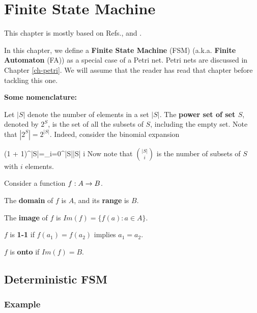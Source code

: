 \chapter{Finite State Machine}
\label{ch-finite-state}

This chapter is mostly based on Refs.\cite{fsm-brilliant}, \cite{wiki-det-automaton} and
\cite{wiki-nondet-automaton}.

In this chapter,
we define a {\bf Finite State Machine} (FSM) (a.k.a. {\bf Finite Automaton} (FA))  as a 
special case of a Petri net.
Petri nets are discussed in Chapter \ref{ch-petri}. We will assume
that the reader has read that chapter before tackling this one.

{\bf Some nomenclature:}

Let $|S|$ denote the number of elements
in a set $|S|$.
The {\bf power set of set $S$}, denoted by $2^S$,
is the set of all the subsets of $S$, including the empty set.
Note that $|2^S|=2^{|S|}$. Indeed,
consider the binomial expansion

\beq
(1 + 1)^{|S|}=\sum_{i=0}^{|S|}{|S| \choose i}
\eeq
Now note that  ${|S|\choose i}$
is the number of subsets of $S$ with $i$ elements.

Consider a function
$f:A\rightarrow B$. 

The {\bf domain} of $f$ is $A$,
and its {\bf range} is $B$.

The {\bf image} of $f$
is $Im(f)=\{f(a): a\in A\}$. 

$f$ is {\bf 1-1} if $f(a_1)=f(a_2)$
implies $a_1=a_2$.


$f$ is {\bf onto} if $Im(f)=B$.

\section{Deterministic FSM}

\subsection{Example}

